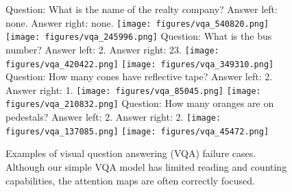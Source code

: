 \documentclass[10pt,twocolumn,letterpaper]{article}
\begin{document}
\begin{figure*}[t]
	\begin{center}
		Question: What is the name of the realty company?
		Answer left: none. Answer right: none.
		\texttt{[image: figures/vqa\_540820.png]}
		\texttt{[image: figures/vqa\_245996.png]}
		Question: What is the bus number?
		Answer left: 2. Answer right: 23.
		\texttt{[image: figures/vqa\_420422.png]}
		\texttt{[image: figures/vqa\_349310.png]}
		Question: How many cones have reflective tape?
		Answer left: 2. Answer right: 1.
		\texttt{[image: figures/vqa\_85045.png]}
		\texttt{[image: figures/vqa\_210832.png]}
		Question: How many oranges are on pedestals?
		Answer left: 2. Answer right: 2.
		\texttt{[image: figures/vqa\_137085.png]}
		\texttt{[image: figures/vqa\_45472.png]}
	\end{center}
	\caption{Examples of visual question answering (VQA) failure cases. Although our simple VQA model has limited reading and counting capabilities, the attention maps are often correctly focused.}
	\label{fig:vqa_fails}
\end{figure*}
\end{document}
